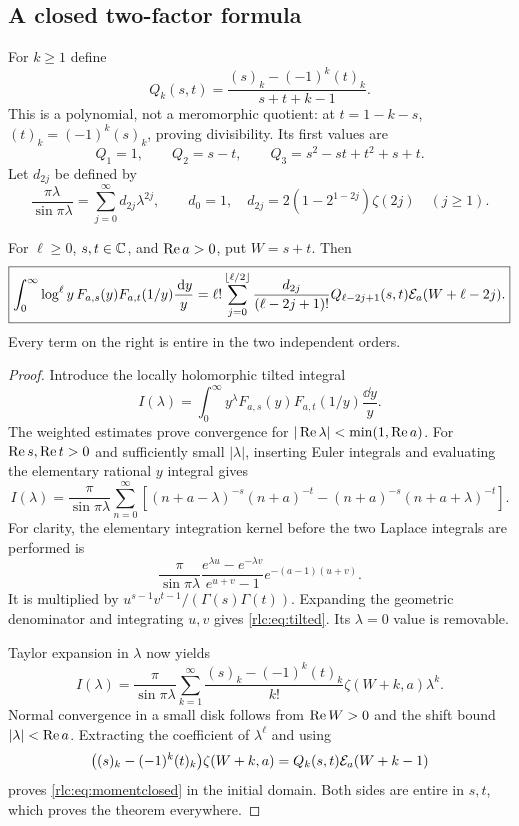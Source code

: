 \subsection{A closed two-factor formula}
For $k\ge1$ define
\begin{equation}\label{rlc:eq:Q}
 Q_k(s,t)=\frac{(s)_k-(-1)^k(t)_k}{s+t+k-1}.
\end{equation}
This is a polynomial, not a meromorphic quotient: at
$t=1-k-s$, $(t)_k=(-1)^k(s)_k$, proving divisibility.
Its first values are
\[
 Q_1=1,\qquad Q_2=s-t,\qquad
 Q_3=s^2-st+t^2+s+t.
\]
Let $d_{2j}$ be defined by
\begin{equation}\label{rlc:eq:dcoeff}
 \frac{\pi\lambda}{\sin\pi\lambda}
 =\sum_{j=0}^\infty d_{2j}\lambda^{2j},\qquad
 d_0=1,\quad
 d_{2j}=2(1-2^{1-2j})\zeta(2j)\quad(j\ge1).
\end{equation}

\begin{theorem}
\label{rlc:thm:twomoments}
For $\ell\ge0$, $s,t\in\mathbb C$, and $\operatorname{Re} a>0$, put $W=s+t$. Then
\begin{equation}\label{rlc:eq:momentclosed}
 \boxed{\displaystyle
 \int_0^\infty\log^\ell y\,F_{a,s}(y)F_{a,t}(1/y)\frac{\,\mathrm d y}{y}
 =\ell!\sum_{j=0}^{\lfloor\ell/2\rfloor}
 \frac{d_{2j}}{(\ell-2j+1)!}
 Q_{\ell-2j+1}(s,t)\mathcal E_a(W+\ell-2j).}
\end{equation}
Every term on the right is entire in the two independent orders.
\end{theorem}
\begin{proof}
Introduce the locally holomorphic tilted integral
\[
 I(\lambda)=\int_0^\infty y^\lambda
 F_{a,s}(y)F_{a,t}(1/y)\frac{\dd y}{y}.
\]
The weighted estimates prove convergence for
$|\operatorname{Re}\lambda|<\min(1,\operatorname{Re} a)$. For
$\operatorname{Re} s,\operatorname{Re} t>0$ and sufficiently small $|\lambda|$, inserting
Euler integrals and evaluating the elementary rational $y$ integral
gives
\begin{equation}\label{rlc:eq:tilted}
 I(\lambda)=\frac{\pi}{\sin\pi\lambda}
 \sum_{n=0}^\infty\left[
 (n+a-\lambda)^{-s}(n+a)^{-t}
 -(n+a)^{-s}(n+a+\lambda)^{-t}\right].
\end{equation}
For clarity, the elementary integration kernel before the two Laplace
integrals are performed is
\[
 \frac{\pi}{\sin\pi\lambda}
 \frac{e^{\lambda u}-e^{-\lambda v}}{e^{u+v}-1}
 e^{-(a-1)(u+v)}.
\]
It is multiplied by $u^{s-1}v^{t-1}/(\Gamma(s)\Gamma(t))$.
Expanding the geometric denominator and integrating $u,v$ gives
\eqref{rlc:eq:tilted}. Its $\lambda=0$ value is removable.

Taylor expansion in $\lambda$ now yields
\[
 I(\lambda)=\frac{\pi}{\sin\pi\lambda}
 \sum_{k=1}^\infty
 \frac{(s)_k-(-1)^k(t)_k}{k!}
       \zeta(W+k,a)\lambda^k.
\]
Normal convergence in a small disk follows from $\operatorname{Re} W>0$ and the
shift bound $|\lambda|<\operatorname{Re} a$. Extracting the coefficient of
$\lambda^\ell$ and using
\[
 \bigl((s)_k-(-1)^k(t)_k\bigr)\zeta(W+k,a)
       =Q_k(s,t)\mathcal E_a(W+k-1)
\]
proves \eqref{rlc:eq:momentclosed} in the initial domain. Both sides
are entire in $s,t$, which proves the theorem everywhere.
\end{proof}

